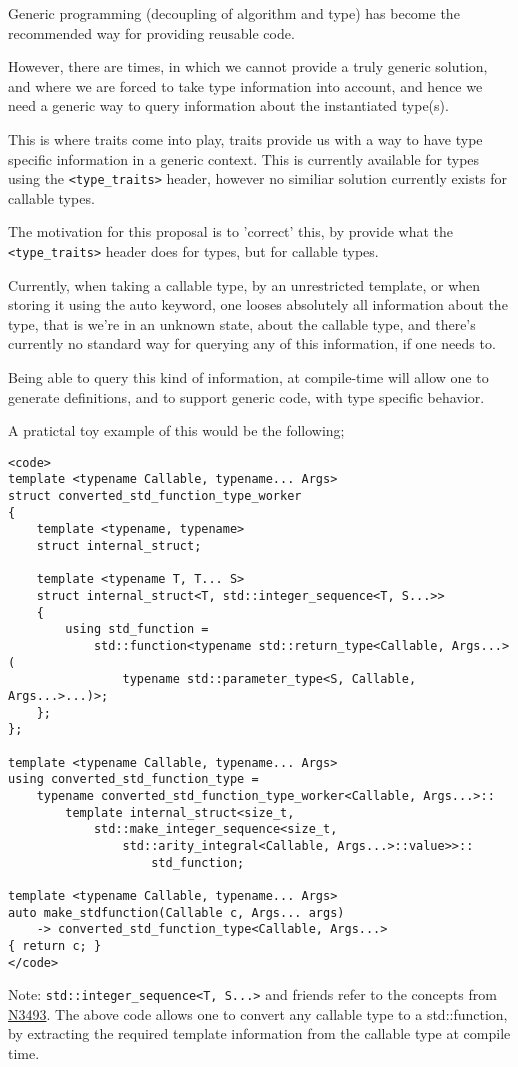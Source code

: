 Generic programming (decoupling of algorithm and type) has become the
recommended way for providing reusable code.

However, there are times, in which we cannot provide a truly generic solution,
and where we are forced to take type information into account, and hence we
need a generic way to query information about the instantiated type(s).

This is where traits come into play, traits provide us with a way to have type
specific information in a generic context. This is currently available for types
using the \verb|<type_traits>| header, however no similiar solution currently
exists for callable types.

The motivation for this proposal is to 'correct' this, by provide what the 
\verb|<type_traits>| header does for types, but for callable types.

Currently, when taking a callable type, by an unrestricted template, or when
storing it using the auto keyword, one looses absolutely all information about
the type, that is we're in an unknown state, about the callable type, and
there's currently no standard way for querying any of this information, if one
needs to.

Being able to query this kind of information, at compile-time will allow one
to generate definitions, and to support generic code, with type specific
behavior.

A pratictal toy example of this would be the following;
\begin{verbatim}
<code>
template <typename Callable, typename... Args>
struct converted_std_function_type_worker
{
    template <typename, typename>
    struct internal_struct;

    template <typename T, T... S>
    struct internal_struct<T, std::integer_sequence<T, S...>>
    {
        using std_function =
            std::function<typename std::return_type<Callable, Args...>(
                typename std::parameter_type<S, Callable, Args...>...)>;
    };
};

template <typename Callable, typename... Args>
using converted_std_function_type =
    typename converted_std_function_type_worker<Callable, Args...>::
        template internal_struct<size_t,
            std::make_integer_sequence<size_t,
                std::arity_integral<Callable, Args...>::value>>::
                    std_function;

template <typename Callable, typename... Args>
auto make_stdfunction(Callable c, Args... args)
    -> converted_std_function_type<Callable, Args...>
{ return c; }
</code>
\end{verbatim}
Note: \verb|std::integer_sequence<T, S...>| and friends refer to the concepts from
\href{http://www.open-std.org/jtc1/sc22/wg21/docs/papers/2013/n3493.html}{N3493}.
\noindent
The above code allows one to convert any callable type to a std::function, by
extracting the required template information from the callable type at compile time.

